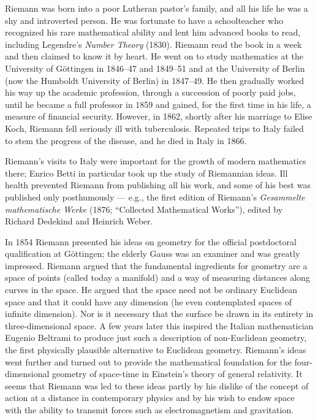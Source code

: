 Riemann was born into a poor Lutheran pastor's family, and all his life he was a shy and introverted person. He was fortunate to have a schoolteacher who recognized his rare mathematical ability and lent him advanced books to read, including Legendre's \textit{Number Theory} (1830). Riemann read the book in a week and then claimed to know it by heart. He went on to study mathematics at the University of Göttingen in 1846--47 and 1849--51 and at the University of Berlin (now the Humboldt University of Berlin) in 1847--49. He then gradually worked his way up the academic profession, through a succession of poorly paid jobs, until he became a full professor in 1859 and gained, for the first time in his life, a measure of financial security. However, in 1862, shortly after his marriage to Elise Koch, Riemann fell seriously ill with tuberculosis. Repeated trips to Italy failed to stem the progress of the disease, and he died in Italy in 1866.

Riemann's visits to Italy were important for the growth of modern mathematics there; Enrico Betti in particular took up the study of Riemannian ideas. Ill health prevented Riemann from publishing all his work, and some of his best was published only posthumously --- e.g., the first edition of Riemann's \textit{Gesammelte mathematische Werke} (1876; ``Collected Mathematical Works''), edited by Richard Dedekind and Heinrich Weber.

In 1854 Riemann presented his ideas on geometry for the official postdoctoral qualification at Göttingen; the elderly Gauss was an examiner and was greatly impressed. Riemann argued that the fundamental ingredients for geometry are a space of points (called today a manifold) and a way of measuring distances along curves in the space. He argued that the space need not be ordinary Euclidean space and that it could have any dimension (he even contemplated spaces of infinite dimension). Nor is it necessary that the surface be drawn in its entirety in three-dimensional space. A few years later this inspired the Italian mathematician Eugenio Beltrami to produce just such a description of non-Euclidean geometry, the first physically plausible alternative to Euclidean geometry. Riemann's ideas went further and turned out to provide the mathematical foundation for the four-dimensional geometry of space-time in Einstein's theory of general relativity. It seems that Riemann was led to these ideas partly by his dislike of the concept of action at a distance in contemporary physics and by his wish to endow space with the ability to transmit forces such as electromagnetism and gravitation.

